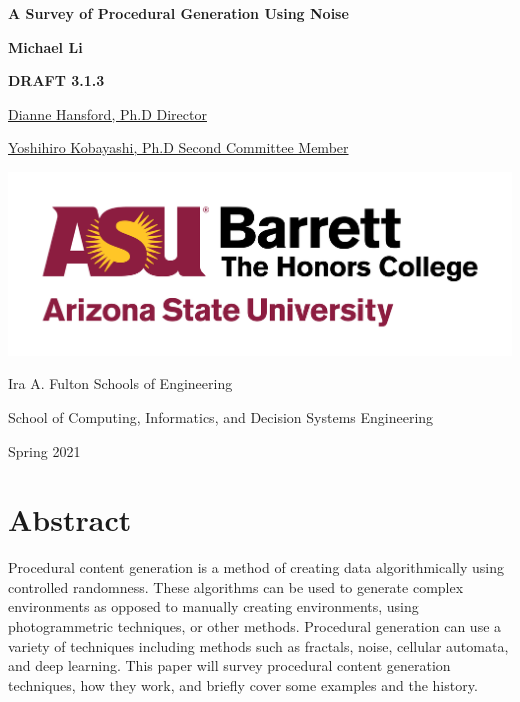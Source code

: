\documentclass[10pt]{report}
\begin{document}
	\begin{titlepage}
		\begin{center}
			\Large
			\textbf{A Survey of Procedural Generation Using Noise}
			
			\vspace{1.5cm}
			\normalsize
			\textbf{Michael Li}
			
			\vfill
			
			\textbf{DRAFT 3.1.3}
			
			\uline{Dianne Hansford, Ph.D \hfill Director}
			\vspace{1cm}
			
			\uline{Yoshihiro Kobayashi, Ph.D \hfill Second Committee Member}
			
			\vspace{3cm}
			
			\includegraphics[scale=.5]{asu_barretthonors_horiz_rgb_maroongold_600ppi}
			
			\vspace{1.5cm}
			Ira A. Fulton Schools of Engineering
			
			School of Computing, Informatics, and Decision Systems Engineering
			
			Spring 2021
			
		\end{center}
	\end{titlepage}
	
	\chapter*{Abstract}
	
	Procedural content generation is a method of creating data algorithmically using controlled randomness. These algorithms can be used to generate complex environments as opposed to manually creating environments, using photogrammetric techniques, or other methods. Procedural generation can use a variety of techniques including methods such as fractals, noise, cellular automata, and deep learning. This paper will survey procedural content generation techniques, how they work, and briefly cover some examples and the history.
	
\end{document}
